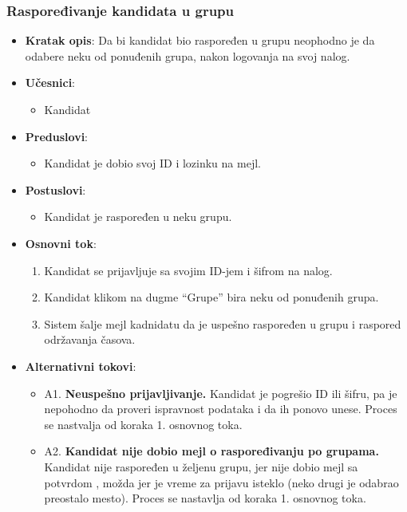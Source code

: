 \subsubsection{Raspoređivanje kandidata u grupu}
\label{subsubsec:grupe}
\begin{itemize}
  \item \textbf{Kratak opis}: Da bi kandidat bio raspoređen u grupu neophodno je da odabere neku od ponuđenih grupa, nakon logovanja na svoj nalog. 
  \item \textbf{Učesnici}: 
    \begin{itemize}
    \item  Kandidat
    \end{itemize}
  \item \textbf{Preduslovi}:
    \begin{itemize}
    \item Kandidat je dobio svoj ID i lozinku na mejl.
    \end{itemize}
  \item \textbf{Postuslovi}:
      \begin{itemize}
      \item Kandidat je raspoređen u neku grupu.
      \end{itemize}
  \item \textbf{Osnovni tok}:
      \begin{enumerate}
        \item Kandidat se prijavljuje sa svojim ID-jem i šifrom na nalog.
        \item Kandidat klikom na dugme “Grupe” bira neku od ponuđenih grupa.
        \item Sistem šalje mejl kadnidatu da je uspešno raspoređen u grupu i raspored održavanja časova.
      \end{enumerate}

  \item \textbf{Alternativni tokovi}:
      \begin{itemize}
        \item A1. \textbf{Neuspešno prijavljivanje.}
        Kandidat je pogrešio ID ili šifru, pa je nepohodno da proveri ispravnost podataka i da ih ponovo unese. Proces se nastvalja od koraka 1. osnovnog toka.
        \item A2. \textbf{Kandidat nije dobio mejl o raspoređivanju po grupama.}
        Kandidat nije raspoređen u željenu grupu, jer nije dobio mejl sa potvrdom , možda jer je vreme za prijavu isteklo (neko drugi je odabrao preostalo mesto). Proces se nastavlja od koraka 1. osnovnog toka.
      \end{itemize}
\end{itemize}